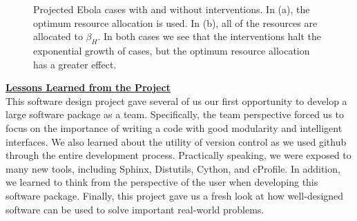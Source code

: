 \documentclass[11pt,letter]{article}
\begin{document}
\begin{figure}
	\centering
\caption{Projected Ebola cases with and without interventions. In (a), the optimum resource allocation is used. In (b), all of the resources are allocated to $\beta_H$. In both cases we see that the interventions halt the exponential growth of cases, but the optimum resource allocation has a greater effect.}
\label{allocation}
\end{figure}

\underline{\textbf{Lessons Learned from the Project}}\vspace{0.5mm}\\
This software design project gave several of us our first opportunity to develop a large software package as a team. Specifically, the team perspective forced us to focus on the importance of writing a code with good modularity and intelligent interfaces. We also learned about the utility of version control as we used github through the entire development process. Practically speaking, we were exposed to many new tools, including Sphinx, Distutils, Cython, and cProfile. In addition, we learned to think from the perspective of the user when developing this software package. Finally, this project gave us a fresh look at how well-designed software can be used to solve important real-world problems. \\
\end{document}
